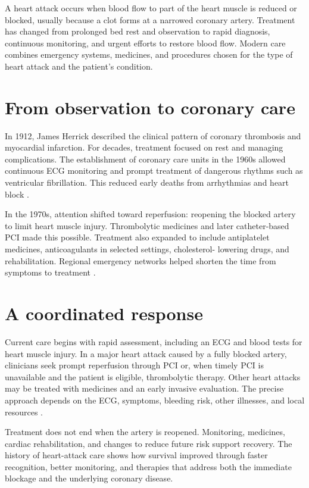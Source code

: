 \documentclass[12pt,oneside]{book}
\begin{document}
A heart attack occurs when blood flow to part of the heart muscle is
reduced or blocked, usually because a clot forms at a narrowed coronary
artery. Treatment has changed from prolonged bed rest and observation to
rapid diagnosis, continuous monitoring, and urgent efforts to restore
blood flow. Modern care combines emergency systems, medicines, and
procedures chosen for the type of heart attack and the patient's
condition.

\section{From observation to coronary care}
In 1912, James Herrick described the clinical pattern of coronary
thrombosis and myocardial infarction. For decades, treatment focused on
rest and managing complications. The establishment of coronary care units
in the 1960s allowed continuous ECG monitoring and prompt treatment of
dangerous rhythms such as ventricular fibrillation. This reduced early
deaths from arrhythmias and heart block \cite{miTreatmentHistory}.

In the 1970s, attention shifted toward reperfusion: reopening the blocked
artery to limit heart muscle injury. Thrombolytic medicines and later
catheter-based PCI made this possible. Treatment also expanded to include
antiplatelet medicines, anticoagulants in selected settings, cholesterol-
lowering drugs, and rehabilitation. Regional emergency networks helped
shorten the time from symptoms to treatment
\cite{miTreatmentHistory,ahaHeartAttackTreatment}.

\section{A coordinated response}
Current care begins with rapid assessment, including an ECG and blood
tests for heart muscle injury. In a major heart attack caused by a fully
blocked artery, clinicians seek prompt reperfusion through PCI or, when
timely PCI is unavailable and the patient is eligible, thrombolytic
therapy. Other heart attacks may be treated with medicines and an early
invasive evaluation. The precise approach depends on the ECG, symptoms,
bleeding risk, other illnesses, and local resources
\cite{ahaHeartAttackTreatment}.

Treatment does not end when the artery is reopened. Monitoring, medicines,
cardiac rehabilitation, and changes to reduce future risk support recovery.
The history of heart-attack care shows how survival improved through
faster recognition, better monitoring, and therapies that address both
the immediate blockage and the underlying coronary disease.
\end{document}
